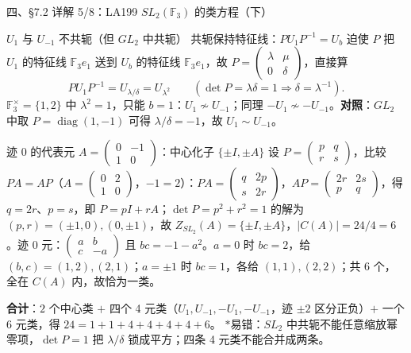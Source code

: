 \documentclass[aspectratio=169,10pt,fontset=none]{ctexbeamer}
\newcommand{\key}[1]{\textcolor{ink}{\bfseries #1}}
\newcommand{\starpt}{\textcolor{accent}{\bfseries$\ast$}}
\begin{document}
\begin{frame}[t]{四、\S7.2 详解 5/8：LA199 $SL_2(\mathbb F_3)$ 的类方程（下）}
\scriptsize
\begin{block}{\footnotesize $U_1$ 与 $U_{-1}$ 不共轭（但 $GL_2$ 中共轭）}
共轭保持特征线：$PU_1P^{-1}=U_b$ 迫使 $P$ 把 $U_1$ 的特征线 $\mathbb F_3 e_1$ 送到 $U_b$ 的特征线 $\mathbb F_3 e_1$，故 $P=\begin{pmatrix}\lambda&\mu\\0&\delta\end{pmatrix}$，直接算
\[
PU_1P^{-1}=U_{\lambda/\delta}=U_{\lambda^2}\qquad(\det P=\lambda\delta=1\Rightarrow\delta=\lambda^{-1}).
\]
$\mathbb F_3^\times=\{1,2\}$ 中 $\lambda^2=1$，只能 $b=1$：$U_1\not\sim U_{-1}$；同理 $-U_1\not\sim-U_{-1}$。\key{对照}：$GL_2$ 中取 $P=\operatorname{diag}(1,-1)$ 可得 $\lambda/\delta=-1$，故 $U_1\sim U_{-1}$。
\end{block}
\begin{block}{\footnotesize 迹 $0$ 的代表元 $A=\begin{pmatrix}0&-1\\1&0\end{pmatrix}$：中心化子 $\{\pm I,\pm A\}$}
设 $P=\begin{pmatrix}p&q\\r&s\end{pmatrix}$，比较 $PA=AP$（$A=\begin{pmatrix}0&2\\1&0\end{pmatrix}$，$-1=2$）：$PA=\begin{pmatrix}q&2p\\s&2r\end{pmatrix}$，$AP=\begin{pmatrix}2r&2s\\p&q\end{pmatrix}$，得 $q=2r$、$p=s$，即 $P=pI+rA$；$\det P=p^2+r^2=1$ 的解为 $(p,r)=(\pm1,0),(0,\pm1)$，故 $Z_{SL_2}(A)=\{\pm I,\pm A\}$，$|C(A)|=24/4=6$。迹 $0$ 元：$\begin{pmatrix}a&b\\c&-a\end{pmatrix}$ 且 $bc=-1-a^2$。$a=0$ 时 $bc=2$，给 $(b,c)=(1,2),(2,1)$；$a=\pm1$ 时 $bc=1$，各给 $(1,1),(2,2)$；共 6 个，全在 $C(A)$ 内，故恰为一类。
\end{block}
\key{合计}：$2$ 个中心类 $+$ 四个 4 元类（$U_1,U_{-1},-U_1,-U_{-1}$，迹 $\pm2$ 区分正负）$+$ 一个 6 元类，得 $24=1+1+4+4+4+4+6$。
\starpt 易错：$SL_2$ 中共轭不能任意缩放幂零项，$\det P=1$ 把 $\lambda/\delta$ 锁成平方；四条 4 元类不能合并成两条。
\end{frame}
\end{document}
